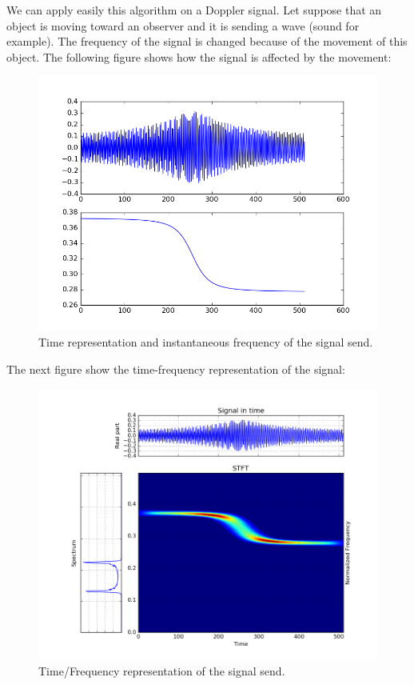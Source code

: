 We can apply easily this algorithm on a Doppler signal. Let suppose that an object is moving toward an observer and it is sending a wave (sound for example). The frequency of the signal is changed because of the movement of this object. The following figure shows how the signal is affected by the movement:

\begin{figure}[H]
\centering
    \includegraphics[scale=0.6,angle=0]{Images/doopler_signal.png}
    \caption{Time representation and instantaneous frequency of the signal send.}
    \label{fig:doopler_signal}
\end{figure}

The next figure show the time-frequency representation of the signal:

\begin{figure}[H]
\centering
    \includegraphics[scale=0.6,angle=0]{Images/doopler_signal_spec.png}
    \caption{Time/Frequency representation of the signal send.}
    \label{fig:doopler_signal_spec}
\end{figure}

